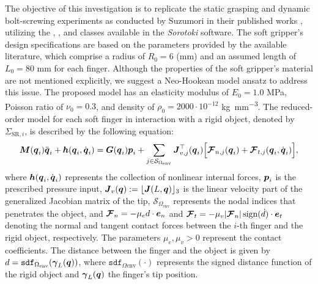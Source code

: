 The objective of this investigation is to replicate the static grasping and dynamic bolt-screwing experiments as conducted by Suzumori in their published works \cite{Suzumori1991, Suzumori1992}, utilizing the , , and  classes available in the \textit{Sorotoki} software. The soft gripper's design specifications are based on the parameters provided by the available literature, which comprise a radius of $R_0 = 6$ (\si{\milli \meter}) and an assumed length of $L_0 = 80$ \si{\milli \meter} for each finger. Although the properties of the soft gripper's material are not mentioned explicitly, we suggest a Neo-Hookean model ansatz to address this issue. The proposed model has an elasticity modulus of $E_0 = 1.0$ \si{\mega \pascal}, Poisson ratio of $\nu_0 = 0.3$, and density of $\rho_0 = 2000 \cdot 10^{-12}$ \si{\kilo \gram \per \milli \metre \cubed}. The reduced-order model for each soft finger in interaction with a rigid object, denoted by $\Sigma_{\textrm{SR},i}$, is described by the following equation:
%
\begin{multline}
    \boldsymbol{M}({\boldsymbol{q}}_i) \ddot{{\boldsymbol{q}}}_i  + {\boldsymbol{h}}({\boldsymbol{q}}_i,{\dot{\boldsymbol{q}}}_i)  =  {\boldsymbol{G}}({\boldsymbol{q}}_i) {\boldsymbol{p}}_i +  \sum_{j\in \mathcal{S}_{\Omega_{\textrm{env}}}} {\boldsymbol{J}}_{v,j}^\top({\boldsymbol{q}}_i) \Big[ {\boldsymbol{\mathcal{F}}}_{{n},j}({\boldsymbol{q}}_i) + {\boldsymbol{\mathcal{F}}}_{{t,j}}({\boldsymbol{q}}_i,\dot{{\boldsymbol{q}}}_i)\Big],
    \label{eq:suzumori_fingermodel_lagrangian}
\end{multline}
%
where ${\boldsymbol{h}}({\boldsymbol{q}}_i,{\dot{\boldsymbol{q}}}_i)$ represents the collection of nonlinear internal forces, ${\boldsymbol{p}}_i$ is the prescribed pressure input, ${\boldsymbol{J}}_v({\boldsymbol{q}}):= \lfloor{\boldsymbol{J}}(L,{\boldsymbol{q}})\rfloor_3$ is the linear velocity part of the generalized Jacobian matrix of the tip, $\mathcal{S}_{\Omega_{\textrm{env}}}$ represents the nodal indices that penetrates the object, and $
{\boldsymbol{\mathcal{F}}}_{{n}} = -\mu_e d \cdot \boldsymbol{e}_n$ and ${\boldsymbol{\mathcal{F}}}_{{t}} = -\mu_v |{\boldsymbol{\mathcal{F}}}_{{n}}| \, \textrm{sign}(\dot{d}) \cdot \boldsymbol{e}_t$ 
denoting the normal and tangent contact forces between the $i$-th finger and the rigid object, respectively. The parameters $\mu_e, \mu_v > 0$ represent the contact coefficients. The distance between the finger and the object is given by $d = \texttt{sdf}_{\Omega_{\textrm{env}}}({\boldsymbol{\gamma}}_L({\boldsymbol{q}}))$, where $\texttt{sdf}_{\Omega{\textrm{env}}}(\cdot)$ represents the signed distance function of the rigid object and ${\boldsymbol{\gamma}}_L({\boldsymbol{q}})$ the finger's tip position. 

